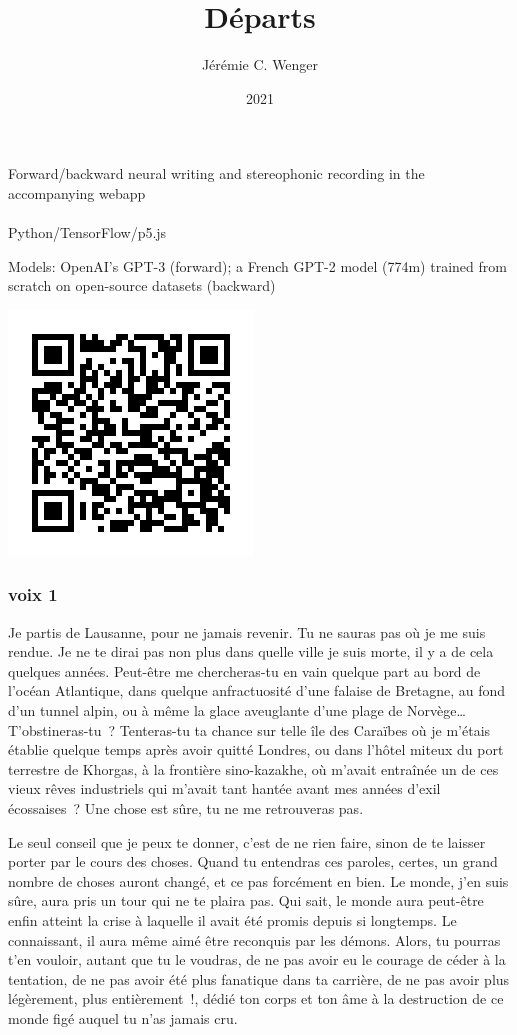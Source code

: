 \documentclass[
  extrafontsizes,
  oneside,
  14pt
]{memoir}
\title{Départs}
\author{Jérémie C. Wenger}
\date{2021}
\begin{document}
\maketitle

\vfill

\noindent Forward/backward neural writing and stereophonic recording in the accompanying webapp
\\
\\
Python/TensorFlow/p5.js

\noindent Models: OpenAI's GPT-3 (forward); a French GPT-2 model (774m)
trained from scratch on open-source datasets (backward)

\includegraphics{qr}

\newpage

\subsubsection{voix 1}\label{voix-1}

Je partis de Lausanne, pour ne jamais revenir. Tu ne sauras pas où je me
suis rendue. Je ne te dirai pas non plus dans quelle ville je suis
morte, il y a de cela quelques années. Peut-être me chercheras-tu en
vain quelque part au bord de l'océan Atlantique, dans quelque
anfractuosité d'une falaise de Bretagne, au fond d'un tunnel alpin, ou à
même la glace aveuglante d'une plage de Norvège\ldots{}
T'obstineras-tu~? Tenteras-tu ta chance sur telle île des Caraïbes où je
m'étais établie quelque temps après avoir quitté Londres, ou dans
l'hôtel miteux du port terrestre de Khorgas, à la frontière
sino-kazakhe, où m'avait entraînée un de ces vieux rêves industriels qui
m'avait tant hantée avant mes années d'exil écossaises~? Une chose est
sûre, tu ne me retrouveras pas.

Le seul conseil que je peux te donner, c'est de ne rien faire, sinon de
te laisser porter par le cours des choses. Quand tu entendras ces
paroles, certes, un grand nombre de choses auront changé, et ce pas
forcément en bien. Le monde, j'en suis sûre, aura pris un tour qui ne te
plaira pas. Qui sait, le monde aura peut-être enfin atteint la crise à
laquelle il avait été promis depuis si longtemps. Le connaissant, il
aura même aimé être reconquis par les démons. Alors, tu pourras t'en
vouloir, autant que tu le voudras, de ne pas avoir eu le courage de
céder à la tentation, de ne pas avoir été plus fanatique dans ta
carrière, de ne pas avoir plus légèrement, plus entièrement~!, dédié ton
corps et ton âme à la destruction de ce monde figé auquel tu n'as jamais
cru.
\end{document}
